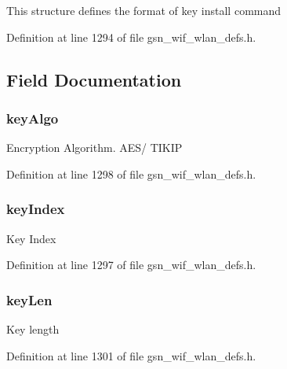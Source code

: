 This structure defines the format of key install command 

Definition at line 1294 of file gsn\_\-wif\_\-wlan\_\-defs.h.



\subsection{Field Documentation}
\hypertarget{a00386_a53fe92daed71e812f41e8b404d4da106}{
\subsubsection[{keyAlgo}]{ {\bf keyAlgo}}}
\label{a00386_a53fe92daed71e812f41e8b404d4da106}
Encryption Algorithm. AES/ TIKIP 

Definition at line 1298 of file gsn\_\-wif\_\-wlan\_\-defs.h.

\hypertarget{a00386_afcf93136bff6ef3037dec249b48d1eba}{
\subsubsection[{keyIndex}]{ {\bf keyIndex}}}
\label{a00386_afcf93136bff6ef3037dec249b48d1eba}
Key Index 

Definition at line 1297 of file gsn\_\-wif\_\-wlan\_\-defs.h.

\hypertarget{a00386_a19c67de3f96782516f1c496a77e01074}{
\subsubsection[{keyLen}]{ {\bf keyLen}}}
\label{a00386_a19c67de3f96782516f1c496a77e01074}
Key length 

Definition at line 1301 of file gsn\_\-wif\_\-wlan\_\-defs.h.

